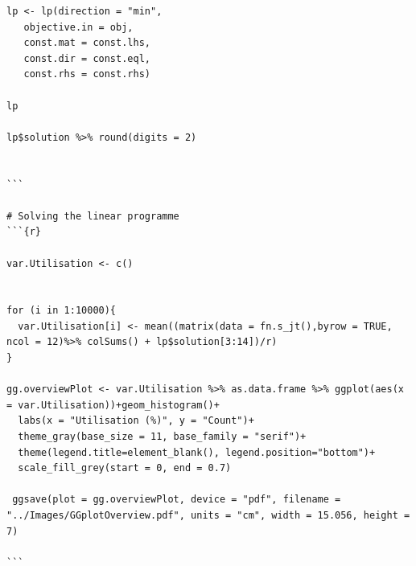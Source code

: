 \documentclass[a4paper,11pt]{article}
\begin{document}
\begin{verbatim}
lp <- lp(direction = "min", 
   objective.in = obj, 
   const.mat = const.lhs, 
   const.dir = const.eql, 
   const.rhs = const.rhs)

lp

lp$solution %>% round(digits = 2)


```

# Solving the linear programme
```{r}

var.Utilisation <- c()
  
  
for (i in 1:10000){
  var.Utilisation[i] <- mean((matrix(data = fn.s_jt(),byrow = TRUE, ncol = 12)%>% colSums() + lp$solution[3:14])/r)
}

gg.overviewPlot <- var.Utilisation %>% as.data.frame %>% ggplot(aes(x = var.Utilisation))+geom_histogram()+
  labs(x = "Utilisation (%)", y = "Count")+
  theme_gray(base_size = 11, base_family = "serif")+
  theme(legend.title=element_blank(), legend.position="bottom")+
  scale_fill_grey(start = 0, end = 0.7)

 ggsave(plot = gg.overviewPlot, device = "pdf", filename = "../Images/GGplotOverview.pdf", units = "cm", width = 15.056, height = 7)

```






\end{verbatim}
\end{document}
